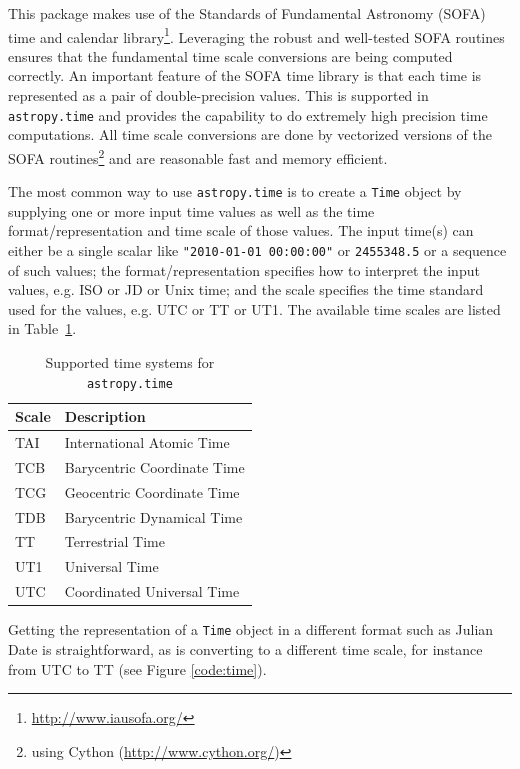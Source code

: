 \documentclass[traditabstract]{aa}
\begin{document}
This package makes use of the Standards of Fundamental Astronomy (SOFA) time
and calendar library\footnote{\url{http://www.iausofa.org/}}. Leveraging the
robust and well-tested SOFA routines ensures that the fundamental time scale
conversions are being computed correctly. An important feature of the SOFA
time library is that each time is represented as a pair of double-precision
values. This is supported in \texttt{astropy.time} and provides the capability
to do extremely high precision time computations. All time scale conversions
are done by vectorized versions of the SOFA routines\footnote{using Cython
(\url{http://www.cython.org/})} and are reasonable fast and memory efficient.

The most common way to use \texttt{astropy.time} is to create a \texttt{Time} object
by supplying one or more input time values as well as the time format/representation
and time scale of those values. The input time(s) can either be a
single scalar like \verb|"2010-01-01 00:00:00"| or \verb|2455348.5| or a
sequence of such values; the format/representation specifies how to interpret the input
values, e.g. ISO or JD or Unix time; and the scale specifies the time standard
used for the values, e.g. UTC or TT or UT1. The available time scales are
listed in Table~\ref{tab:time_systems}.

\begin{table}
\caption{Supported time systems for \texttt{astropy.time}\label{tab:time_systems}}
\center
\begin{tabular}{ll}
\hline
Scale  & Description \\
\hline
TAI    & International Atomic Time \\
TCB    & Barycentric Coordinate Time \\
TCG    & Geocentric Coordinate Time \\
TDB    & Barycentric Dynamical Time \\
TT     & Terrestrial Time \\
UT1    & Universal Time \\
UTC    & Coordinated Universal Time \\
\hline
\end{tabular}
\end{table}

Getting the representation of a \texttt{Time} object in a different format
such as Julian Date is straightforward, as is converting to a different time
scale, for instance from UTC to TT (see Figure \ref{code:time}).

\end{document}
